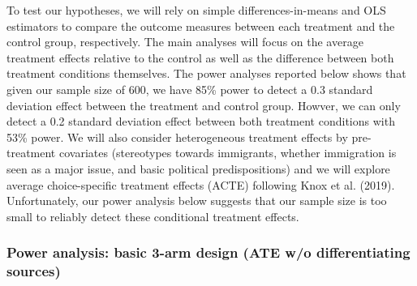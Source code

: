 \documentclass[]{article}
\begin{document}
To test our hypotheses, we will rely on simple differences-in-means and
OLS estimators to compare the outcome measures between each treatment
and the control group, respectively. The main analyses will focus on the
average treatment effects relative to the control as well as the
difference between both treatment conditions themselves. The power
analyses reported below shows that given our sample size of 600, we have
85\% power to detect a 0.3 standard deviation effect between the
treatment and control group. Howver, we can only detect a 0.2 standard
deviation effect between both treatment conditions with 53\% power. We
will also consider heterogeneous treatment effects by pre-treatment
covariates (stereotypes towards immigrants, whether immigration is seen
as a major issue, and basic political predispositions) and we will
explore average choice-specific treatment effects (ACTE) following Knox
et al. (2019). Unfortunately, our power analysis below suggests that our
sample size is too small to reliably detect these conditional treatment
effects.

\hypertarget{power-analysis-basic-3-arm-design-ate-wo-differentiating-sources}{%
\subsubsection{Power analysis: basic 3-arm design (ATE w/o
differentiating
sources)}\label{power-analysis-basic-3-arm-design-ate-wo-differentiating-sources}}
\end{document}

